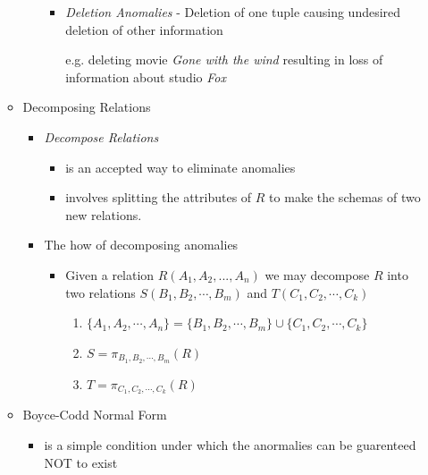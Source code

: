 \documentclass[12pt]{article}
\begin{document}
\begin{enumerate}[1.]
\begin{itemize}
\begin{itemize}
\begin{itemize}
                \item \textit{Deletion Anomalies} - Deletion of one tuple causing
                undesired deletion of other information

                \bigskip

                e.g. deleting movie \textit{Gone with the wind} resulting
                in loss of information about studio \textit{Fox}


            \end{itemize}
        \end{itemize}

        \item Decomposing Relations
        \begin{itemize}
            \item \textit{Decompose Relations}
            \begin{itemize}
                \item is an accepted way to eliminate anomalies
                \item involves splitting the attributes of $R$ to make the schemas of two new relations.
            \end{itemize}
            \item The how of decomposing anomalies
            \begin{itemize}
                \item Given a relation $R(A_1,A_2,...,A_n)$ we may decompose
                $R$ into two relations $S(B_1, B_2, \cdots, B_m)$ and $T(C_1, C_2, \cdots, C_k)$

                \bigskip

                \begin{enumerate}[1.]
                    \item $\{A_1, A_2, \cdots, A_n\} = \{B_1, B_2, \cdots, B_m\} \cup \{C_1,C_2, \cdots, C_k\}$
                    \item $S = \pi_{B_1, B_2, \cdots, B_m}(R)$
                    \item $T = \pi_{C_1, C_2, \cdots, C_k}(R)$
                \end{enumerate}

            \end{itemize}
        \end{itemize}

        \item Boyce-Codd Normal Form
        \begin{itemize}
            \item is a simple condition under which the anormalies can be
            guarenteed NOT to exist


\end{itemize}
\end{itemize}
\end{enumerate}
\end{document}
